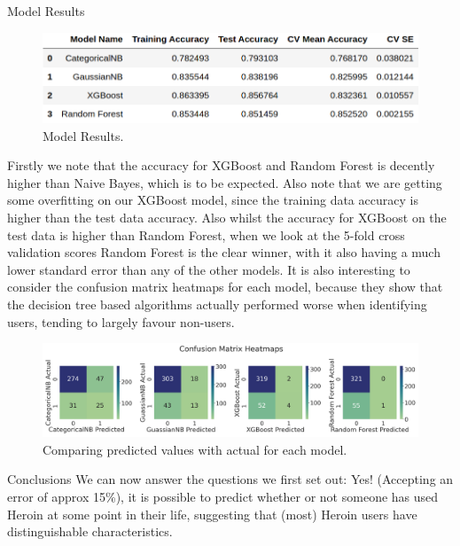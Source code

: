 \documentclass[6pt, final, xcolor=table]{beamer}
\newlength{\colwidth}
\begin{document}
\begin{frame}[t]
\begin{columns}[t]
\begin{column}{\colwidth}
\begin{block}{Model Results}
  \begin{figure}[h!]
    \centering
     \includegraphics[scale=1.5]{model_results.png}
    \caption{Model Results.}
    \label{fig:method}
    \end{figure}  
    
Firstly we note that the accuracy for XGBoost and Random Forest is decently higher than
Naive Bayes, which is to be expected. Also note that we are getting some overfitting on our
XGBoost model, since the training data accuracy is higher than the test data accuracy.
Also whilst the accuracy for XGBoost on the test data is higher than Random Forest,
when we look at the 5-fold cross validation scores Random Forest is the clear winner,
with it also having a much lower standard error than any of the other models.
It is also interesting to consider the confusion matrix heatmaps for each model, because they show that the decision tree based algorithms actually performed worse when identifying users, tending to largely favour non-users.
 
  \begin{figure}[h!]
    \centering
     \includegraphics[scale=0.9]{conf_mat_heatmaps.png}
    \caption{Comparing predicted values with actual for each model.}
    \label{fig:conf_matrix}
    \end{figure}   

  \end{block}
  \begin{alertblock}{Conclusions}
We can now answer the questions we first set out:
Yes! (Accepting an error of approx 15\%), it is possible to predict whether or not
someone has used Heroin at some point in their life, suggesting
that (most) Heroin users have distinguishable characteristics.
  \end{alertblock}
  

\end{column}
\end{columns}
\end{frame}
\end{document}
